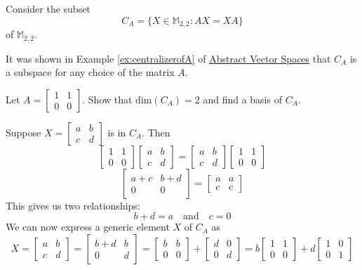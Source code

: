 \documentclass{ximera}
\begin{document}
\begin{example}\label{ex:CAbasis}
Consider the subset
\begin{equation*}
C_A = \{X \in\mathbb{M}_{2,2} : AX = XA \}
\end{equation*}
of $\mathbb{M}_{2,2}$. 

It was shown in Example \ref{ex:centralizerofA} of \href{https://ximera.osu.edu/oerlinalg/LinearAlgebra/VSP-0050/main}{Abstract Vector Spaces} that $C_A$ is a subspace for any choice of the matrix $A$.

Let $A = 
\begin{bmatrix}
1 & 1 \\
0 & 0
\end{bmatrix}$.
Show that $\mbox{dim}(C_A) = 2$ and find a basis of $C_A$.

\begin{explanation}
 Suppose $X = 
\begin{bmatrix}
a & b \\
c & d
\end{bmatrix}$
 is in $C_A$.  
 Then
 $$\begin{bmatrix}1&1\\0&0\end{bmatrix}\begin{bmatrix}a&b\\c&d\end{bmatrix}=\begin{bmatrix}a&b\\c&d\end{bmatrix}\begin{bmatrix}1&1\\0&0\end{bmatrix}$$
 $$\begin{bmatrix}a+c&b+d\\0&0\end{bmatrix}=\begin{bmatrix}a&a\\c&c\end{bmatrix}$$
 This gives us two relationships:  
 $$b+d=a\quad\text{and}\quad c=0$$
 We can now express a generic element $X$ of $C_A$ as
 $$X=\begin{bmatrix}a&b\\c&d\end{bmatrix}=\begin{bmatrix}b+d&b\\0&d\end{bmatrix}=\begin{bmatrix}b&b\\0&0\end{bmatrix}+\begin{bmatrix}d&0\\0&d\end{bmatrix}=b\begin{bmatrix}1&1\\0&0\end{bmatrix}+d\begin{bmatrix}1&0\\0&1\end{bmatrix}$$
 

\end{explanation}
\end{example}
\end{document}
